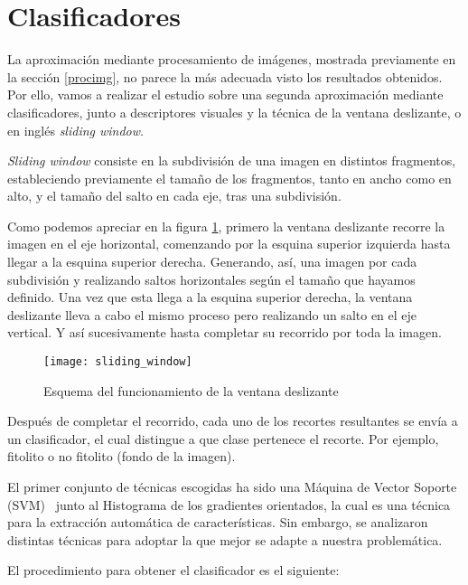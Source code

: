 \section{Clasificadores}

La aproximación mediante procesamiento de imágenes, mostrada previamente en la sección \ref{procimg}, no parece la más adecuada visto los resultados obtenidos. Por ello, vamos a realizar el estudio sobre una segunda aproximación  mediante clasificadores, junto a descriptores visuales y la técnica de la ventana deslizante, o en inglés \textit{sliding window}.

\textit{Sliding window} consiste en la subdivisión de una imagen en distintos fragmentos, estableciendo previamente el tamaño de los fragmentos, tanto en ancho como en alto, y el tamaño del salto en cada eje, tras una subdivisión. 

Como podemos apreciar en la figura \ref{fig:sliding_window}, primero la ventana deslizante recorre la imagen en el eje horizontal, comenzando por la esquina superior izquierda hasta llegar a la esquina superior derecha. Generando, así, una imagen por cada subdivisión y realizando saltos horizontales según el tamaño que hayamos definido. Una vez que esta llega a la esquina superior derecha, la ventana deslizante lleva a cabo el mismo proceso pero realizando un salto en el eje vertical. Y así sucesivamente hasta completar su recorrido por toda la imagen.

\begin{figure}
\centering
\texttt{[image: sliding\_window]}
\caption[Esquema del funcionamiento de la ventana deslizante]{Esquema del funcionamiento de la ventana deslizante~\cite{jcp}}
\label{fig:sliding_window}
\end{figure}

Después de completar el recorrido, cada uno de los recortes resultantes se envía a un clasificador, el cual distingue a que clase pertenece el recorte. Por ejemplo, fitolito o no fitolito (fondo de la imagen).

El primer conjunto de técnicas escogidas ha sido una Máquina de Vector Soporte (SVM)~\cite{svm} junto al Histograma de los gradientes orientados, la cual es una técnica para la extracción automática de características. Sin embargo, se analizaron distintas técnicas para adoptar la que mejor se adapte a nuestra problemática.

El procedimiento para obtener el clasificador es el siguiente:

